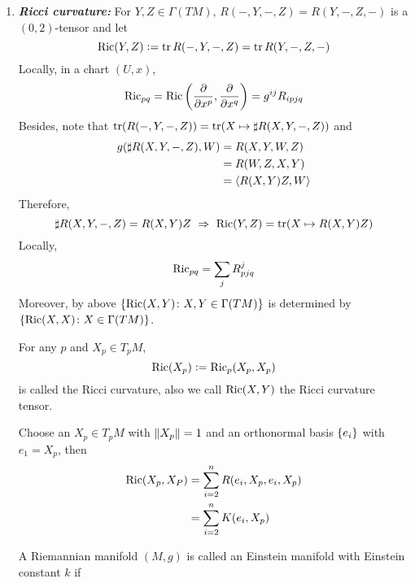 \begin{enumerate}[label=\arabic{*}.]
	\item \emph{\textbf{Ricci curvature:}} For $Y,Z \in \Gamma(TM)$, $R(-,Y,-,Z) = R(Y,-,Z,-)$ is a $(0,2)$-tensor and let
	\begin{equation*}
		\operatorname{Ric}(Y,Z)\vcentcolon= \operatorname{tr}R(-,Y,-,Z) = \operatorname{tr}R(Y,-,Z,-)
	\end{equation*}
	Locally, in a chart $(U,x)$,
	\begin{equation*}
		\operatorname{Ric}_{pq} = \operatorname{Ric}\left(\frac{\partial}{\partial x^p},\frac{\partial}{\partial x^q}\right) = g^{ij}R_{ipjq}
	\end{equation*}
	Besides, note that $\operatorname{tr}(R(-,Y,-,Z)) = \operatorname{tr}(X \mapsto \sharp R(X,Y,-,Z))$ and
	\begin{equation*}
		\begin{aligned}
			g(\sharp R(X,Y,-,Z),W) &= R(X,Y,W,Z) \\
			&= R(W,Z,X,Y)\\
			&= \left\langle R(X,Y)Z,W \right\rangle
		\end{aligned}
	\end{equation*}
	Therefore,
	\begin{equation*}
		\sharp R(X,Y,-,Z) = R(X,Y)Z ~\Rightarrow~ \operatorname{Ric}(Y,Z) = \operatorname{tr}(X \mapsto R(X,Y)Z)
	\end{equation*}
	Locally,
	\begin{equation*}
		\operatorname{Ric}_{pq} = \sum_jR^j_{pjq}
	\end{equation*}
	Moreover, by above $\left\{\operatorname{Ric}(X,Y)\colon X,Y \in \Gamma(TM)\right\}$ is determined by $\left\{\operatorname{Ric}(X,X)\colon X \in \Gamma(TM)\right\}$.
	\begin{defn}
	 	For any $p$ and $X_p \in T_pM$,
	 	\begin{equation*}
	 		\operatorname{Ric}(X_p) \vcentcolon= \operatorname{Ric}_p(X_p,X_p)
	 	\end{equation*}
	 	is called the Ricci curvature, also we call $\operatorname{Ric}(X,Y)$ the Ricci curvature tensor.
	\end{defn}
	\begin{rmk}
		Choose an $X_p \in T_pM$ with $\left\lVert X_p\right\lVert =1$ and an orthonormal basis $\left\{e_i\right\}$ with $e_1 = X_p$, then
		\begin{equation*}
			\begin{aligned}
				\operatorname{Ric}(X_p,X_P) &= \sum_{i=2}^n R(e_i,X_p,e_i,X_p)\\
				&= \sum_{i=2}^n K(e_i,X_p)
			\end{aligned}
		\end{equation*}
	\end{rmk}
	\begin{rmk}
		A Riemannian manifold $(M,g)$ is called an Einstein manifold with Einstein constant $k$ if

\end{rmk}
\end{enumerate}
